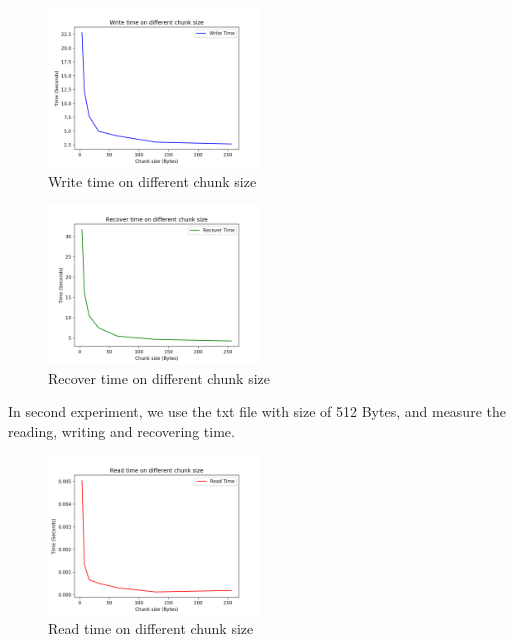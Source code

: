 \documentclass[journal]{IEEEtran}
\begin{document}
\begin{figure}[htbp]

	\centering

	\captionsetup{justification=centering}

	\includegraphics[width=0.5\textwidth]{fig/result_write.png}

	\caption{Write time on different chunk size}

\end{figure}


\begin{figure}[htbp]

	\centering

	\captionsetup{justification=centering}

	\includegraphics[width=0.5\textwidth]{fig/result_recover.png}

	\caption{Recover time on different chunk size}

\end{figure}


In second experiment, we use the txt file with size of 512 Bytes, and measure the reading, writing and recovering time.


\begin{figure}[htbp]

	\centering

	\captionsetup{justification=centering}

	\includegraphics[width=0.5\textwidth]{fig/result_read_small.png}

	\caption{Read time on different chunk size}

\end{figure}
\end{document}
